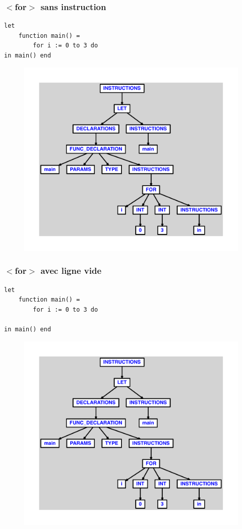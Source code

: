 \documentclass{article}
\begin{document}
\subsubsection{$ < $for$ > $ sans instruction}
\begin{lstlisting}
let
	function main() =
		for i := 0 to 3 do
in main() end
\end{lstlisting}
\newpage
\begin{figure}[H]
\centering
\includegraphics[max width=\textwidth]{ast/ast_207.pdf}
\end{figure}
\newpage
\subsubsection{$ < $for$ > $ avec ligne vide}
\begin{lstlisting}
let
	function main() =
		for i := 0 to 3 do

in main() end
\end{lstlisting}
\newpage
\begin{figure}[H]
\centering
\includegraphics[max width=\textwidth]{ast/ast_208.pdf}
\end{figure}
\newpage
\end{document}
